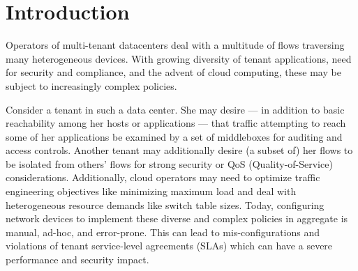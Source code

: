 \section{Introduction}

Operators of multi-tenant datacenters deal with a multitude of
flows traversing many heterogeneous devices. With growing
diversity of tenant applications, need for security and compliance,
and the advent of cloud computing, these may be subject to
increasingly complex policies.

Consider a tenant in such a data center. She may desire --- in addition
to basic reachability among her hosts or applications --- that traffic
attempting to reach some of her applications be examined by a set of
middleboxes for auditing and access controls. Another tenant may
additionally desire (a subset of) her flows to be isolated from
others' flows for strong security or QoS (Quality-of-Service) considerations.
 Additionally,
cloud operators may need to optimize traffic engineering objectives
like minimizing maximum load 
and deal with heterogeneous resource demands like switch table 
sizes. Today, configuring network devices to implement these diverse
and complex policies in aggregate is manual, ad-hoc, and error-prone. 
This can lead to mis-configurations and violations of tenant
service-level agreements (SLAs) which can have a severe performance and
security impact.



